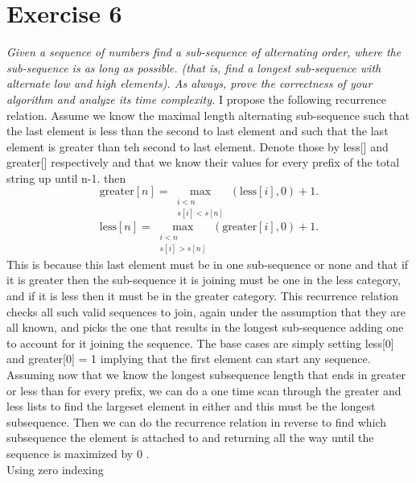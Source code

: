 \documentclass{amsart}
\begin{document}
\section{Exercise 6}
\emph{Given a sequence of numbers find a sub-sequence of alternating order, where the sub-sequence is as long as possible. (that is, find a longest sub-sequence with alternate low and high elements). As always, prove the correctness of your algorithm and analyze its time complexity.}
I propose the following recurrence relation. Assume we know the maximal length alternating sub-sequence such that the last element is less than the second to last element and such that the last element is greater than teh second to last element.
Denote those by less[] and greater[] respectively and that we know their values for every prefix of the total string up until n-1. then
\[
    \text{greater}[n] = \max_{\substack{i < n \\ s[i] < s[n]}}(\text{less}[i], 0) + 1
.\] 
\[
    \text{less}[n] = \max_{\substack{i < n \\ s[i] > s[n]}}(\text{greater}[i], 0) + 1
.\] 
This is because this last element must be in one sub-sequence or none and that if it is greater then
the sub-sequence it is joining must be one in the less category, and if it is less then it must be in the greater category.
This recurrence relation checks all such valid sequences to join, again under the assumption that they are all known, and picks the one that
results in the longest sub-sequence adding one to account for it joining the sequence.
The base cases are simply setting less[0] and greater[0] = 1 implying that the first element can start any sequence.
Assuming now that we know the longest subsequence length that ends in greater or less than for every prefix, we can do a 
one time scan through the greater and less lists to find the largeset element in either and this must be the longest subsequence.
Then we can do the recurrence relation in reverse to find which subsequence the element is attached to and returning all the way until the sequence is maximized by 0 .
\\
Using zero indexing
\end{document}

